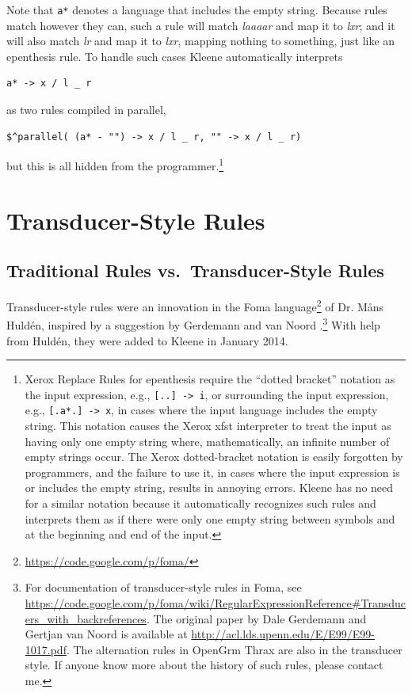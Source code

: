 \noindent
Note that \verb!a*! denotes a language that includes the empty string.
Because rules match however they can, such a rule will match \emph{laaaar} and map it to \emph{lxr}; and it will also
match \emph{lr} and map it to \emph{lxr}, mapping nothing to
something, just like an epenthesis rule.  To handle such cases Kleene
automatically interprets 

\begin{Verbatim}
a* -> x / l _ r
\end{Verbatim}

\noindent
as two rules compiled in parallel, 

\begin{Verbatim}
$^parallel( (a* - "") -> x / l _ r, "" -> x / l _ r)
\end{Verbatim}

\noindent
but this is all hidden from the programmer.\footnote{Xerox Replace Rules for epenthesis require the ``dotted bracket'' notation as
the input expression, e.g.,  \verb![..] -> i!, or surrounding the input
expression, e.g., \verb![.a*.] -> x!, in
cases where the input language includes the empty string.  This notation causes the Xerox xfst interpreter to treat
the input as having only one empty string where, mathematically, an
infinite number of empty strings occur.  The Xerox
dotted-bracket notation is easily forgotten by programmers, and the failure to use it, in cases where the input
expression is or includes the empty string, results in annoying errors.  Kleene
has no need for a similar notation because it automatically recognizes such rules and interprets them as if there
were only one empty string between symbols and at the beginning and end
of the input.}

\section{Transducer-Style Rules}

\subsection{Traditional Rules vs.\ Transducer-Style Rules}

Transducer-style rules were an innovation in the Foma
language\footnote{\url{https://code.google.com/p/foma/}} of Dr.\@
M\r{a}ns Huldén, inspired by a suggestion by Gerdemann and van Noord
\citep{gerdemann+vannoord:1999}.\footnote{For documentation of
	transducer-style rules in Foma, see
\url{https://code.google.com/p/foma/wiki/RegularExpressionReference#Transducers_with_backreferences}.
The original paper by Dale Gerdemann and Gertjan van Noord is available
at \url{http://acl.lds.upenn.edu/E/E99/E99-1017.pdf}.  The alternation
rules in OpenGrm Thrax are also in the transducer style.  If anyone know
more about the history of such rules, please contact me.}  With help from
Huldén, they were added to Kleene in January 2014.

